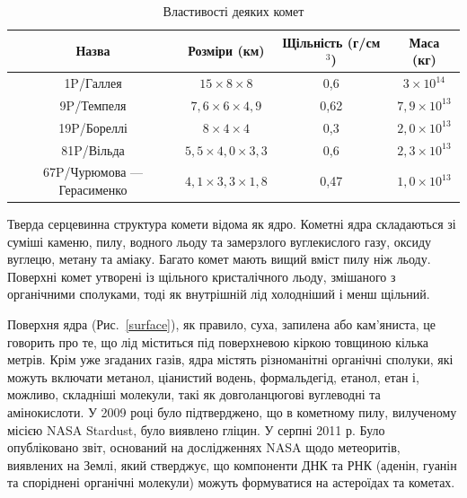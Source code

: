\documentclass[a4paper]{article}
\begin{document}
    \begin{table}[t]
        \centering
        \caption{Властивості деяких комет}\label{Table1}
        \vspace*{1ex}
        \begin{tabular}{cccc}
            \hline
            Назва                           & Розміри (км)              & Щільність (г/см$^3$)  & Маса (кг)\\
            \hline
             1P/Галлея                      & $15\times8\times8$        & 0,6                   & $3\times 10^{14}$\\
             9P/Темпеля                     & $7,6\times6\times4,9$     & 0,62                  & $7,9\times10^{13}$\\
             19P/Бореллі                    & $8\times4\times4$         & 0,3                   & $2,0\times10^{13}$\\
             81P/Вільда                     & $5,5\times4,0\times3,3$   & 0,6                   & $2,3\times10^{13}$\\
             67P/Чурюмова --- Герасименко   & $4,1\times3,3\times1,8$   & 0,47                  & $1,0\times10^{13}$\\
            \hline 
        \end{tabular}
        \vspace*{-3ex}
    \end{table}
    
    Тверда серцевинна структура комети відома як ядро. Кометні ядра складаються зі суміші каменю, пилу, водного льоду та замерзлого вуглекислого газу, оксиду вуглецю, метану та аміаку. Багато комет мають вищий вміст пилу ніж льоду. Поверхні комет утворені із щільного кристалічного льоду, змішаного з органічними сполуками, тоді як внутрішній лід холодніший і менш щільний.
    
    Поверхня ядра (Рис.~\ref{surface}), як правило, суха, запилена або кам'яниста\cite{15}, це говорить про те, що лід міститься під поверхневою кіркою товщиною кілька метрів. Крім уже згаданих газів, ядра містять різноманітні органічні сполуки, які можуть включати метанол, ціанистий водень, формальдегід, етанол, етан і, можливо, складніші молекули, такі як довголанцюгові вуглеводні та амінокислоти. У 2009 році було підтверджено, що в кометному пилу, вилученому місією NASA Stardust, було виявлено гліцин. У серпні 2011 р. Було опубліковано звіт, оснований на дослідженнях NASA щодо метеоритів, виявлених на Землі, який стверджує, що компоненти ДНК та РНК (аденін, гуанін та споріднені органічні молекули) можуть формуватися на астероїдах та кометах.
    
\end{document}

